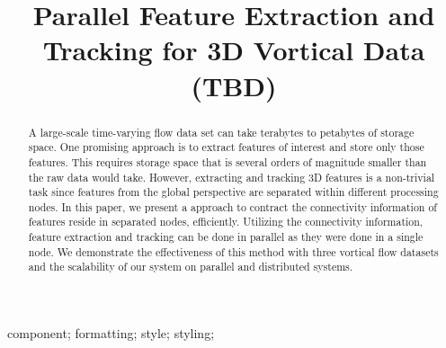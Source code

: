 \documentclass[10pt, conference, compsocconf]{IEEEtran}
\begin{document}
\title{Parallel Feature Extraction and Tracking for 3D Vortical Data (TBD)}


\author{
\and
{}
}

\maketitle


\begin{abstract}
A large-scale time-varying flow data set can take terabytes to petabytes of storage space. One promising approach is to extract features of interest and store only those features. This requires storage space that is several orders of magnitude smaller than the raw data would take. However, extracting and tracking 3D features is a non-trivial task since features from the global perspective are separated within different processing nodes. In this paper, we present a approach to contract the connectivity information of features reside in separated nodes, efficiently. Utilizing the connectivity information, feature extraction and tracking can be done in parallel as they were done in a single node. We demonstrate the effectiveness of this method with three vortical flow datasets and the scalability of our system on parallel and distributed systems.
\end{abstract}

\begin{IEEEkeywords}
component; formatting; style; styling;
\end{IEEEkeywords}

%
\IEEEpeerreviewmaketitle
\end{document}
